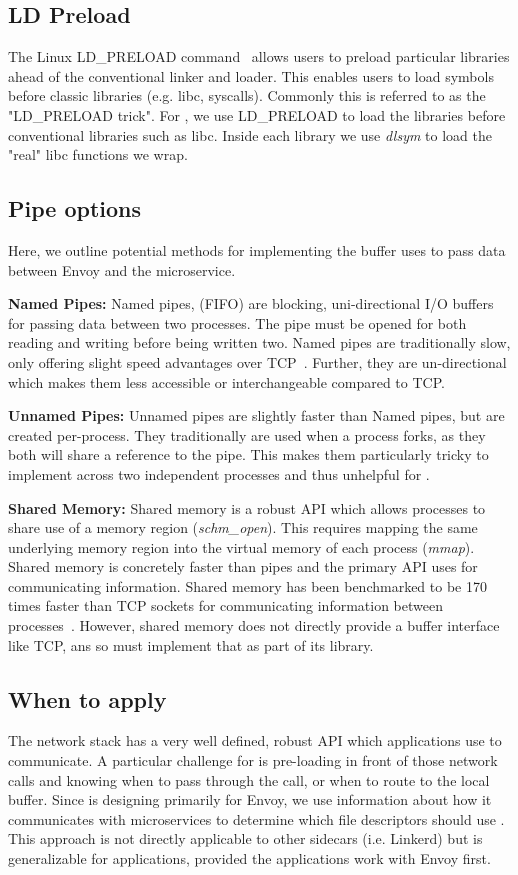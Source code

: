 \subsection{LD Preload}
The Linux LD\_PRELOAD command~\cite{ldpreload} allows users to preload particular libraries ahead of the conventional linker and loader.
This enables users to load symbols before classic libraries (e.g. libc, syscalls).
Commonly this is referred to as the "LD\_PRELOAD trick".
For \sysname, we use LD\_PRELOAD to load the \sysname libraries before conventional libraries such as libc.
Inside each \sysname library we use \textit{dlsym} to load the "real" libc functions we wrap.

\subsection{Pipe options}
Here, we outline potential methods for implementing the buffer \sysname uses to pass data between Envoy and the microservice.

\textbf{Named Pipes:}
Named pipes, (FIFO) are blocking, uni-directional I/O buffers for passing data between two processes.
The pipe must be opened for both reading and writing before being written two.
Named pipes are traditionally slow, only offering slight speed advantages over TCP~\cite{ipcperf}.
Further, they are un-directional which makes them less accessible or interchangeable compared to TCP.

\textbf{Unnamed Pipes:}
Unnamed pipes are slightly faster than Named pipes, but are created per-process.
They traditionally are used when a process forks, as they both will share a reference to the pipe.
This makes them particularly tricky to implement across two independent processes and thus unhelpful for \sysname.

\textbf{Shared Memory:}
Shared memory is a robust API which allows processes to share use of a memory region (\textit{schm\_open}).
This requires mapping the same underlying memory region into the virtual memory of each process (\textit{mmap}).
Shared memory is concretely faster than pipes and the primary API \sysname uses for communicating information.
Shared memory has been benchmarked to be 170 times faster than TCP sockets for communicating information between processes~\cite{ipcperf}.
However, shared memory does not directly provide a buffer interface like TCP, ans so \sysname must implement that as part of its library.


\subsection{When to apply \sysname}
The network stack has a very well defined, robust API which applications use to communicate.
A particular challenge for \sysname is pre-loading in front of those network calls and knowing when
to pass through the call, or when to route to the local buffer.
Since \sysname is designing primarily for Envoy, we use information about how it communicates with microservices to determine
which file descriptors should use \sysname.
This approach is not directly applicable to other sidecars (i.e. Linkerd) but is generalizable for applications, provided the applications work with Envoy first.

